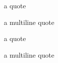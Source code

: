 \begin{Quotation}
a quote

a
multiline
quote
\end{Quotation}

\horizontalLine

\begin{Quotation}
a quote
\end{Quotation}

\horizontalLine

\begin{Quotation}
a
multiline
quote
\end{Quotation}
